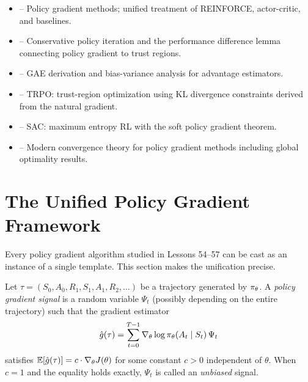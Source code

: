 \documentclass[11pt,a4paper]{article}
\begin{document}
\begin{itemize}
  \item \citet[Chapter 13]{suttonbarto2018} -- Policy gradient methods;
    unified treatment of REINFORCE, actor-critic, and baselines.
  \item \citet{kakade2002cpi} -- Conservative policy iteration and the
    performance difference lemma connecting policy gradient to trust
    regions.
  \item \citet{schulman2015} -- GAE derivation and bias-variance
    analysis for advantage estimators.
  \item \citet{schulman2015trpo} -- TRPO: trust-region optimization
    using KL divergence constraints derived from the natural gradient.
  \item \citet{haarnoja2018} -- SAC: maximum entropy RL with the soft
    policy gradient theorem.
  \item \citet[Chapters 5--8]{agarwal2021} -- Modern convergence theory
    for policy gradient methods including global optimality results.
\end{itemize}

\section{The Unified Policy Gradient Framework}

Every policy gradient algorithm studied in Lessons 54--57 can be cast
as an instance of a single template. This section makes the unification
precise.

\begin{definition}
\label{def:psi}
Let $\tau = (S_0, A_0, R_1, S_1, A_1, R_2, \ldots)$ be a trajectory
generated by $\pi_\theta$. A \emph{policy gradient signal} is a
random variable $\Psi_t$ (possibly depending on the entire trajectory)
such that the gradient estimator
\[
  \hat{g}(\tau) = \sum_{t=0}^{T-1}
  \nabla_\theta \log \pi_\theta(A_t \mid S_t)\, \Psi_t
\]
satisfies $\mathbb{E}[\hat{g}(\tau)] = c \cdot \nabla_\theta J(\theta)$ for
some constant $c > 0$ independent of $\theta$. When $c = 1$ and the
equality holds exactly, $\Psi_t$ is called an \emph{unbiased} signal.
\end{definition}
\end{document}
